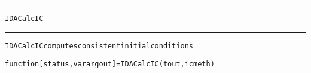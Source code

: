 \begin{samepage}
\hrule
\begin{center}
{\large \verb!IDACalcIC!}
\label{p:IDACalcIC}
\end{center}
\hrule\vspace{0.1in}



\begin{alltt}
IDACalcIC computes consistent initial conditions
\end{alltt}

\end{samepage}



\begin{samepage}


\begin{alltt}
function [status, varargout] = IDACalcIC(tout,icmeth) 
\end{alltt}

\end{samepage}



